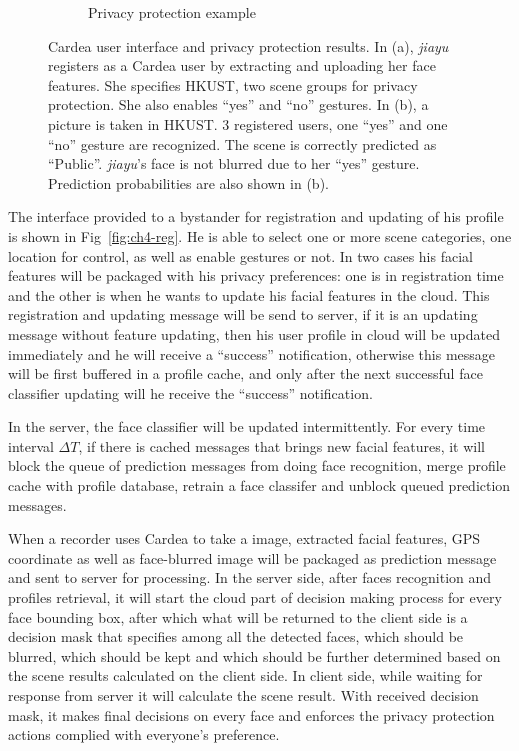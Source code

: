 \begin{description}[leftmargin=0cm]
\begin{figure}[!htbp]
{{\begin{subfigure}[b]{0.5\textwidth}
        \caption{Privacy protection example}
        \label{fig:ch4-allres}
      \end{subfigure}
    }
  }
  \caption{Cardea user interface and privacy protection results. In (a), \textit{jiayu} registers as a Cardea user by extracting and uploading her face features. She specifies HKUST, two scene groups for privacy protection. She also enables ``yes'' and ``no'' gestures. In (b), a picture is taken in HKUST. 3 registered users, one ``yes'' and one ``no'' gesture are recognized. The scene is correctly predicted as ``Public''. \textit{jiayu}'s face is not blurred due to her ``yes'' gesture. Prediction probabilities are also shown in (b).}
  \label{fig:ch4-uires}
\end{figure}

  \item[{Registration and Profile updating:}] The interface provided to a bystander for registration and updating of his profile is shown in Fig~\ref{fig:ch4-reg}. He is able to select one or more scene categories, one location for control, as well as enable gestures or not. In two cases his facial features will be packaged with his privacy preferences: one is in registration time and the other is when he wants to update his facial features in the cloud. This registration and updating message will be send to server, if it is an updating message without feature updating, then his user profile in cloud will be updated immediately and he will receive a ``success'' notification, otherwise this message will be first buffered in a profile cache, and only after the next successful face classifier updating will he receive the ``success'' notification.

  \item[{Face classifier updating:}] In the server, the face classifier will be updated intermittently. For every time interval $\Delta T$, if there is cached messages that brings new facial features, it will  block the queue of prediction messages from doing face recognition,  merge profile cache with profile database,  retrain a face classifer and  unblock queued prediction messages.

  \item[{Image capturing:}] When a recorder uses Cardea to take a image, extracted facial features, GPS coordinate as well as face-blurred image will be packaged as prediction message and sent to server for processing. In the server side, after faces recognition and profiles retrieval, it will start the cloud part of decision making process for every face bounding box, after which what will be returned to the client side is a decision mask that specifies among all the detected faces, which should be blurred, which should be kept and which should be further determined based on the scene results calculated on the client side. In client side, while waiting for response from server it will calculate the scene result. With received decision mask, it makes final decisions on every face and enforces the privacy protection actions complied with everyone's preference.


\end{description}
